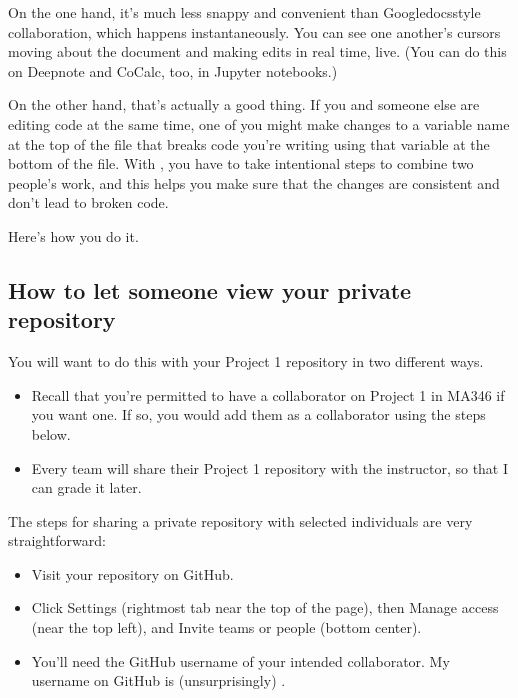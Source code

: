 \documentclass[letterpaper,10pt,english]{sphinxmanual}
\begin{document}
On the one hand, it’s much less snappy and convenient than Google\sphinxhyphen{}docs\sphinxhyphen{}style collaboration, which happens instantaneously.  You can see one another’s cursors moving about the document and making edits in real time, live.  (You can do this on Deepnote and CoCalc, too, in Jupyter notebooks.)

On the other hand, that’s actually a good thing.  If you and someone else are editing code at the same time, one of you might make changes to a variable name at the top of the file that breaks code you’re writing using that variable at the bottom of the file.  With , you have to take intentional steps to combine two people’s work, and this helps you make sure that the changes are consistent and don’t lead to broken code.

Here’s how you do it.


\subsection{How to let someone view your private repository}
\label{\detokenize{chapter-8-version-control:how-to-let-someone-view-your-private-repository}}
You will want to do this with your Project 1 repository in two different ways.
\begin{itemize}
\item {} 
Recall that you’re permitted to have a collaborator on Project 1 in MA346 if you want one.  If so, you would add them as a collaborator using the steps below.

\item {} 
Every team will share their Project 1 repository with the instructor, so that I can grade it later.

\end{itemize}

The steps for sharing a private repository with selected individuals are very straightforward:
\begin{itemize}
\item {} 
Visit your repository on GitHub.

\item {} 
Click Settings (rightmost tab near the top of the page), then Manage access (near the top left), and Invite teams or people (bottom center).

\item {} 
You’ll need the GitHub username of your intended collaborator.  My username on GitHub is (unsurprisingly) .

\end{itemize}
\end{document}
